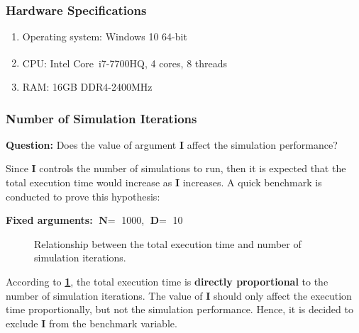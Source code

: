 \documentclass[12pt, a4paper]{article}
\let\oldcref\cref
\renewcommand{\cref}[1]{\textbf{\oldcref{#1}}}
\begin{document}
\subsubsection{Hardware Specifications} \label{subsec:hardware}
\begin{enumerate}
  \item Operating system: Windows 10 64-bit
  \item CPU: Intel\textsuperscript{\textregistered} Core\texttrademark\ i7-7700HQ, 4 cores, 8
  threads
  \item RAM: 16GB DDR4-2400MHz
\end{enumerate}

\subsubsection{Number of Simulation Iterations}
\textbf{Question:} Does the value of argument \textbf{I} affect the simulation performance?

Since \textbf{I} controls the number of simulations to run, then it is expected that the
total execution time would increase as \textbf{I} increases. A quick benchmark is conducted to
prove this hypothesis:

\textbf{Fixed arguments:} $\textbf{N} =$ 1000, $\textbf{D} =$ 10

\begin{figure}[ht]
  \centering
  \caption{Relationship between the total execution time and number of simulation iterations.}
  \label{figure:simulation_iterations}
\end{figure}

According to \cref{figure:simulation_iterations}, the total execution time is \textbf{directly
proportional} to the number of simulation iterations. The value of \textbf{I} should only affect the
execution time proportionally, but not the simulation performance. Hence, it is decided to exclude
\textbf{I} from the benchmark variable.
\end{document}
